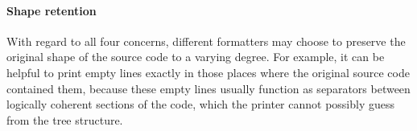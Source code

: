 \vspace{1cm} \paragraph{Shape retention}
With regard to all four concerns,
different formatters may choose to preserve
the original shape of the source code to a varying degree.
For example, it can be helpful to print empty lines
exactly in those places where the original source code contained them,
\autocite[Section: Empty lines]{prettierRationale}
because these empty lines usually function as
separators between logically coherent sections of the code,
which the printer cannot possibly guess from the tree structure.
